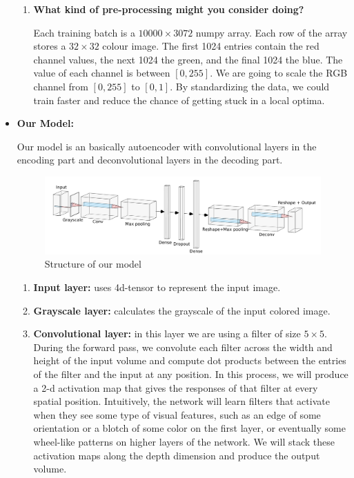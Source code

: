 \documentclass[letter]{article}
\begin{document}
\begin{itemize}
\begin{enumerate}
		\item {\textbf{What kind of pre-processing might you consider doing?}}
		\par{Each training batch is a $ 10000\times3072 $ numpy array. Each row of the array stores a $ 32\times32 $ colour image. The first 1024 entries contain the red channel values, the next 1024 the green, and the final 1024 the blue. The value of each channel is between $ [0, 255] $. We are going to scale the RGB channel from $ [0, 255] $ to $ [0, 1] $. By standardizing the data, we could train faster and reduce the chance of getting stuck in a local optima.}
	\end{enumerate}
	\item {\textbf{Our Model:}} 
	\par{Our model is an basically autoencoder with convolutional layers in the encoding part and deconvolutional layers in the decoding part.}
	\begin{figure}[H]
		\centering
		\includegraphics[width=\textwidth]{figs/structure.pdf}
		\caption{Structure of our model}
	\end{figure}
	\begin{enumerate}
		\item {\textbf{Input layer:} uses 4d-tensor to represent the input image.}
		\item {\textbf{Grayscale layer:} calculates the grayscale of the input colored image.}
		\item {\textbf{Convolutional layer:} in this layer we are using a filter of size $ 5\times5 $. During the forward pass, we convolute each filter across the width and height of the input volume and compute dot products between the entries of the filter and the input at any position. In this process, we will produce a 2-d activation map that gives the responses of that filter at every spatial position. Intuitively, the network will learn filters that activate when they see some type of visual features, such as an edge of some orientation or a blotch of some color on the first layer, or eventually some wheel-like patterns on higher layers of the network. We will stack these activation maps along the depth dimension and produce the output volume.}

\end{enumerate}
\end{itemize}
\end{document}

